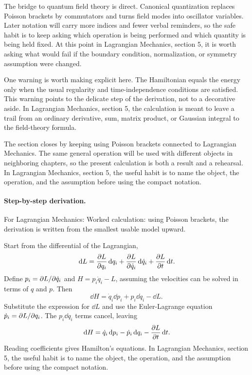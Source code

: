 The bridge to quantum field theory is direct.  Canonical quantization replaces Poisson brackets by commutators and turns field modes into oscillator variables.  Later notation will carry more indices and fewer verbal reminders, so the safe habit is to keep asking which operation is being performed and which quantity is being held fixed.  At this point in Lagrangian Mechanics, section 5, it is worth asking what would fail if the boundary condition, normalization, or symmetry assumption were changed.

One warning is worth making explicit here.  The Hamiltonian equals the energy only when the usual regularity and time-independence conditions are satisfied.  This warning points to the delicate step of the derivation, not to a decorative aside.  In Lagrangian Mechanics, section 5, the calculation is meant to leave a trail from an ordinary derivative, sum, matrix product, or Gaussian integral to the field-theory formula.

The section closes by keeping using Poisson brackets connected to Lagrangian Mechanics.  The same general operation will be used with different objects in neighboring chapters, so the present calculation is both a result and a rehearsal.  In Lagrangian Mechanics, section 5, the useful habit is to name the object, the operation, and the assumption before using the compact notation.



\paragraph{Step-by-step derivation.}

For Lagrangian Mechanics: Worked calculation: using Poisson brackets, the derivation is written from the smallest usable model upward.

Start from the differential of the Lagrangian,
\[
  \,\mathrm d L=\frac{\partial L}{\partial q_i}\,\mathrm d q_i+\frac{\partial L}{\partial\dot q_i}\,\mathrm d\dot q_i+\frac{\partial L}{\partial t}\,\mathrm d t.
\]
Define \(p_i=\partial L/\partial\dot q_i\) and \(H=p_i\dot q_i-L\), assuming the velocities can be solved in terms of \(q\) and \(p\).  Then
\[
  \dd H=\dot q_i\dd p_i+p_i\dd\dot q_i-\dd L.
\]
Substitute the expression for \(\dd L\) and use the Euler-Lagrange equation \(\dot p_i=\partial L/\partial q_i\).  The \(p_i\dd\dot q_i\) terms cancel, leaving
\[
  \,\mathrm d H=\dot q_i\,\mathrm d p_i-\dot p_i\,\mathrm d q_i-\frac{\partial L}{\partial t}\,\mathrm d t.
\]
Reading coefficients gives Hamilton's equations.  In Lagrangian Mechanics, section 5, the useful habit is to name the object, the operation, and the assumption before using the compact notation.

